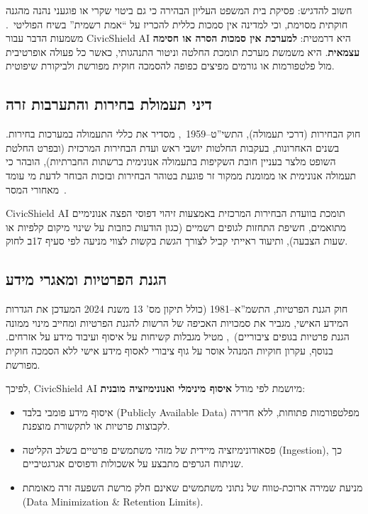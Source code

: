 חשוב להדגיש: פסיקת בית המשפט העליון הבהירה כי גם ביטוי שקרי או פוגעני נהנה מהגנה חוקתית מסוימת, וכי למדינה אין סמכות כללית להכריז על ``אמת רשמית'' בשיח הפוליטי~\cite{barak2012proportionality}. משמעות הדבר עבור \textenglish{CivicShield AI} היא דרמטית: \textbf{למערכת אין סמכות הסרה או חסימה עצמאית}. היא משמשת מערכת תומכת החלטה וניטור התנהגותי, כאשר כל פעולה אופרטיבית מול פלטפורמות או גורמים מפיצים כפופה להסמכה חוקית מפורשת ולביקורת שיפוטית.

\subsection{דיני תעמולת בחירות והתערבות זרה}

חוק הבחירות (דרכי תעמולה), התשי''ט--1959~\cite{elections_propaganda1959}, מסדיר את כללי התעמולה במערכות בחירות. בשנים האחרונות, בעקבות החלטות יושבי ראש ועדת הבחירות המרכזית (ובפרט החלטת השופט מלצר בעניין חובת השקיפות בתעמולה אנונימית ברשתות החברתיות), הובהר כי תעמולה אנונימית או ממומנת ממקור זר פוגעת בטוהר הבחירות ובזכות הבוחר לדעת מי עומד מאחורי המסר~\cite{cec_transparency2019}.

\textenglish{CivicShield AI} תומכת בוועדת הבחירות המרכזית באמצעות זיהוי דפוסי הפצה אנונימיים מתואמים, חשיפת התחזות לגופים רשמיים (כגון הודעות כוזבות על שינוי מיקום קלפיות או שעות הצבעה), ותיעוד ראייתי קביל לצורך הגשת בקשות לצווי מניעה לפי סעיף 17ב לחוק.

\subsection{הגנת הפרטיות ומאגרי מידע}

חוק הגנת הפרטיות, התשמ''א--1981 (כולל תיקון מס' 13 משנת 2024 המעדכן את הגדרות המידע האישי, מגביר את סמכויות האכיפה של הרשות להגנת הפרטיות ומחייב מינוי ממונה הגנת פרטיות בגופים ציבוריים)~\cite{privacy_law1981}, מטיל מגבלות קשיחות על איסוף ועיבוד מידע על אזרחים. בנוסף, עקרון חוקיות המנהל אוסר על גוף ציבורי לאסוף מידע אישי ללא הסמכה חוקית מפורשת.

לפיכך, \textenglish{CivicShield AI} מיושמת לפי מודל \textbf{איסוף מינימלי ואנונימיזציה מובנית}:
\begin{itemize}
    \item איסוף מידע פומבי בלבד (\textenglish{Publicly Available Data}) מפלטפורמות פתוחות, ללא חדירה לקבוצות פרטיות או לתקשורת מוצפנת.
    \item פסאודונימיזציה מיידית של מזהי משתמשים פרטיים בשלב הקליטה (\textenglish{Ingestion}), כך שניתוח הגרפים מתבצע על אשכולות ודפוסים אגרגטיביים.
    \item מניעת שמירה ארוכת-טווח של נתוני משתמשים שאינם חלק מרשת השפעה זרה מאומתת (\textenglish{Data Minimization \& Retention Limits}).
\end{itemize}

